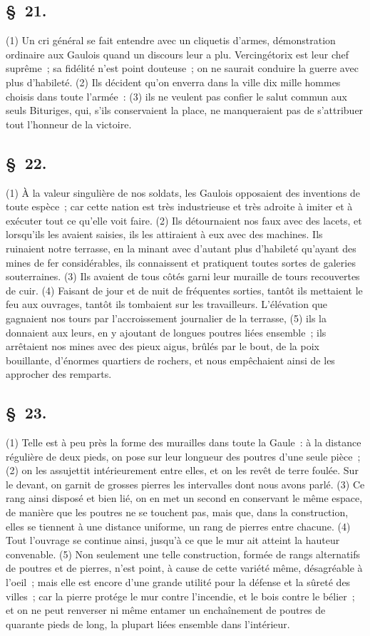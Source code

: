 \documentclass[french,twoside]{book} %
\begin{document}
\subsection[{§ 21.}]{ \textsc{§ 21.} }
\noindent (1) Un cri général se fait entendre avec un cliquetis d’armes, démonstration ordinaire aux Gaulois quand un discours leur a plu. Vercingétorix est leur chef suprême ; sa fidélité n’est point douteuse ; on ne saurait conduire la guerre avec plus d’habileté. (2) Ils décident qu’on enverra dans la ville dix mille hommes choisis dans toute l’armée : (3) ils ne veulent pas confier le salut commun aux seuls Bituriges, qui, s’ils conservaient la place, ne manqueraient pas de s’attribuer tout l’honneur de la victoire.
\subsection[{§ 22.}]{ \textsc{§ 22.} }
\noindent (1) À la valeur singulière de nos soldats, les Gaulois opposaient des inventions de toute espèce ; car cette nation est très industrieuse et très adroite à imiter et à exécuter tout ce qu’elle voit faire. (2) Ils détournaient nos faux avec des lacets, et lorsqu’ils les avaient saisies, ils les attiraient à eux avec des machines. Ils ruinaient notre terrasse, en la minant avec d’autant plus d’habileté qu’ayant des mines de fer considérables, ils connaissent et pratiquent toutes sortes de galeries souterraines. (3) Ils avaient de tous côtés garni leur muraille de tours recouvertes de cuir. (4) Faisant de jour et de nuit de fréquentes sorties, tantôt ils mettaient le feu aux ouvrages, tantôt ils tombaient sur les travailleurs. L'élévation que gagnaient nos tours par l’accroissement journalier de la terrasse, (5) ils la donnaient aux leurs, en y ajoutant de longues poutres liées ensemble ; ils arrêtaient nos mines avec des pieux aigus, brûlés par le bout, de la poix bouillante, d’énormes quartiers de rochers, et nous empêchaient ainsi de les approcher des remparts.
\subsection[{§ 23.}]{ \textsc{§ 23.} }
\noindent (1) Telle est à peu près la forme des murailles dans toute la Gaule : à la distance régulière de deux pieds, on pose sur leur longueur des poutres d’une seule pièce ; (2) on les assujettit intérieurement entre elles, et on les revêt de terre foulée. Sur le devant, on garnit de grosses pierres les intervalles dont nous avons parlé. (3) Ce rang ainsi disposé et bien lié, on en met un second en conservant le même espace, de manière que les poutres ne se touchent pas, mais que, dans la construction, elles se tiennent à une distance uniforme, un rang de pierres entre chacune. (4) Tout l’ouvrage se continue ainsi, jusqu’à ce que le mur ait atteint la hauteur convenable. (5) Non seulement une telle construction, formée de rangs alternatifs de poutres et de pierres, n’est point, à cause de cette variété même, désagréable à l’oeil ; mais elle est encore d’une grande utilité pour la défense et la sûreté des villes ; car la pierre protége le mur contre l’incendie, et le bois contre le bélier ; et on ne peut renverser ni même entamer un enchaînement de poutres de quarante pieds de long, la plupart liées ensemble dans l’intérieur.
\end{document}
